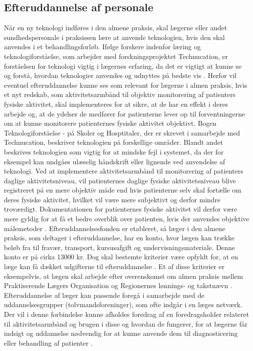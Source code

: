  
\subsection{Efteruddannelse af personale}
Når en ny teknologi indføres i den almene praksis, skal lægerne eller andet sundhedspersonale i praksissen lære at anvende teknologien, hvis den skal anvendes i et behandlingsforløb. 
Ifølge forskere indenfor læring og teknologiforståelse, som arbejder med forskningsprojektet Technucation, er forståelsen for teknologi vigtig i lægernes erfaring, da det er vigtigt at kunne se og forstå, hvordan teknologier anvendes og udnyttes på bedste vis \citep{aarhusuniversitet2013}. Herfor vil eventuel efteruddannelse kunne ses som relevant for lægerne i almen praksis, hvis et nyt redskab, som aktivitetsarmbånd til objektiv monitorering af patienters fysiske aktivitet, skal implementeres for at sikre, at de har en effekt i deres arbejde og, at de ydelser de medfører for patienterne lever op til forventningerne om at kunne monitorere patienternes fysiske aktivitet objektivt. Bogen Teknologiforståelse - på Skoler og Hosptitaler, der er skrevet i samarbejde med Technucation, beskriver teknologien på forskellige områder. Blandt andet beskrives teknologien som vigtig for at mindske fejl i systemet, da der for eksempel kan undgåes ulæselig håndskrift eller lignende ved anvendelse af teknologi. Ved at implementere aktivitetsarmbånd til monitorering af patienters daglige aktivitetsniveau, vil patienternes daglige fysiske aktivitetsniveau blive registreret på en mere objektiv måde end hvis patienterne selv skal fortælle om deres fysiske aktivitet, hvilket vil være mere subjektivt og derfor mindre troværdigt. Dokumentationen for patienternes fysiske aktivitet vil derfor være mere gyldig for at få et bedre overblik over patienten, hvis der anvendes objektive målemetoder \citep{hasse2012}. 
Efteruddannelsesfonden er etableret, så læger i den almene praksis, som deltager i efteruddannelse, har en konto, hvor lægen kan trække beløb fra til fravær, transport, kursusafgift og undervisningsmateriale. Denne konto er på cirka 13000 kr. Dog skal bestemte kriterier være opfyldt for, at en læge kan få dækket udgifterne til efteruddannelse \citep{vedsted2005}. Et af disse kriterier er eksempelvis, at lægen skal arbejde efter overenskomst om almen praksis mellem Praktiserende Lægers Organisation og Regionernes lønnings- og takstnævn \citep{fondenforalmenpraksis2016}. Efteruddannelse af læger kan passende foregå i samarbejde med de uddannelsesgrupper (tolvmandsforeninger), som ofte indgår i en læges netværk. Der vil i denne forbindelse kunne afholdes foredrag af en foredragsholder relateret til aktivitetsarmbånd og brugen i disse og hvordan de fungerer, for at lægerne får indsigt og uddannelse nødvendig for at kunne anvende dem til diagnosticering eller behandling af patienter \citep{vedsted2005}. 
\\
